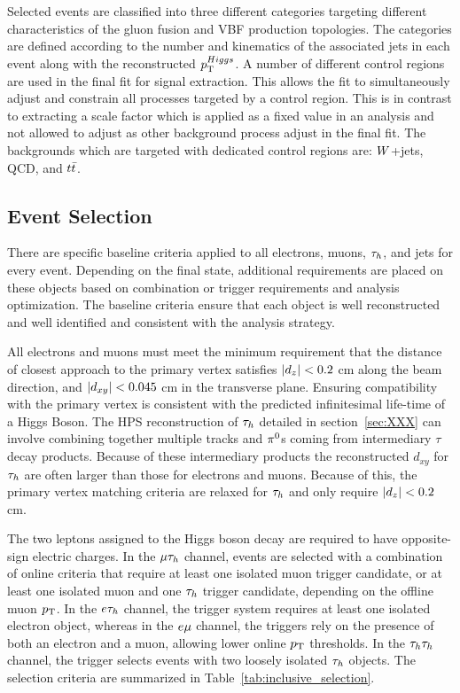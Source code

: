 Selected events are classified into three different categories targeting different characteristics
of the gluon fusion and VBF production topologies.  The categories are defined according to the
number and kinematics of the associated jets in each event along with the reconstructed $p_\mathrm{T}^{Higgs}$.
A number of different control regions are used in the final fit for signal extraction.  This allows
the fit to simultaneously adjust and constrain all processes targeted by a control region.  This is in
contrast to extracting a scale factor which is applied as a fixed value in an analysis and not
allowed to adjust as other background process adjust in the final fit.  The backgrounds which are
targeted with dedicated control regions are: $W$+jets, QCD, and $t\bar{t}$.



\subsection{Event Selection}

There are specific baseline criteria applied to all electrons, muons, $\tau_{h}$, and jets for every
event.  Depending on the final state, additional requirements are placed on these objects based
on combination or trigger requirements and analysis optimization.  The baseline criteria ensure
that each object is well reconstructed and well identified and consistent with the analysis
strategy. 

All electrons and muons must meet the minimum requirement
that the distance of closest approach to the primary vertex satisfies $\lvert d_z\rvert<0.2$ cm
along the beam direction, and $\lvert d_{xy}\rvert<0.045$ cm in the transverse plane. Ensuring
compatibility with the primary vertex is consistent with the predicted infinitesimal life-time of
a Higgs Boson. The HPS reconstruction of $\tau_{h}$ detailed in section~\ref{sec:XXX} can involve
combining together multiple tracks and $\pi^{0}$s coming from intermediary $\tau$ decay products.
Because of these intermediary products the reconstructed $d_{xy}$ for $\tau_{h}$ are often
larger than those for electrons and muons.  Because of this, the primary vertex matching
criteria are relaxed for $\tau_{h}$ and only require $\lvert d_z\rvert<0.2$ cm.

The two leptons assigned to the Higgs boson decay are required to have opposite-sign electric charges.
In the $\mu\tau_{h}$ channel, events are selected with a combination of online criteria that require at least one isolated muon trigger candidate, or at least one isolated muon and one $\tau_{h}$ trigger candidate, depending on the offline muon $p_\mathrm{T}$. In the $e\tau_{h}$ channel, the trigger system requires at least one isolated
electron object, whereas in the $e\mu$ channel, the triggers  rely on the presence of both an electron and a muon, allowing
lower online $p_\mathrm{T}$ thresholds.
In the $\tau_{h}\tau_{h}$ channel, the trigger selects events with two loosely isolated $\tau_{h}$ objects.
The selection criteria are summarized in Table~\ref{tab:inclusive_selection}.

